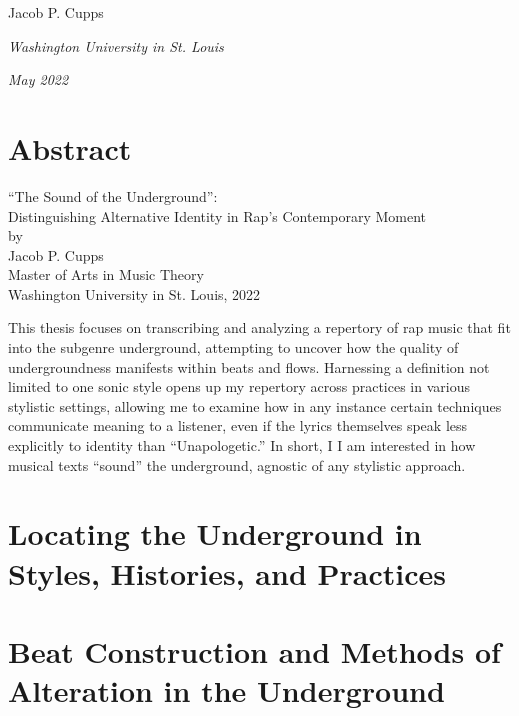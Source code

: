 \documentclass[12pt]{report}
\begin{document}
\vspace{0.2cm}
\hfill{Jacob P. Cupps}

\noindent \textit{Washington University in St. Louis}

\noindent \textit{May 2022}

    \chapter*{Abstract}
    
    \begin{center}
        \large ``The Sound of the Underground'': \\
        \large Distinguishing Alternative Identity in Rap's Contemporary Moment  \\
        \normalsize by \\
        Jacob P. Cupps \\
        Master of Arts in Music Theory \\
        
        Washington University in St. Louis, 2022 \\
    \end{center}
    

This thesis focuses on transcribing and analyzing a repertory of rap music that fit into
the subgenre underground, attempting to uncover how the quality of undergroundness manifests
within beats and flows. Harnessing a definition not limited to one sonic style opens up my 
repertory across practices in various stylistic settings, allowing me to examine how in any
instance certain techniques communicate meaning to a listener, even if the lyrics themselves
speak less explicitly to identity than ``Unapologetic.'' In short, I I am interested in how 
musical texts ``sound'' the underground, agnostic of any stylistic approach.


\chapter{Locating the Underground in Styles, Histories, and Practices}


\chapter{Beat Construction and Methods of Alteration in the Underground}

\end{document}

